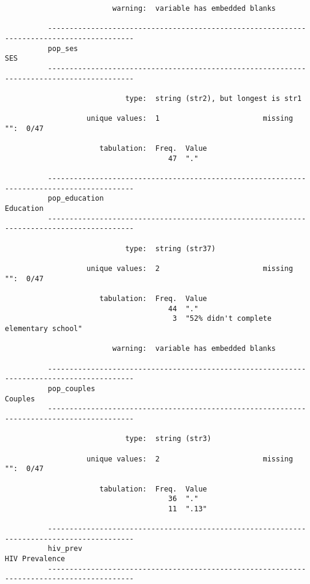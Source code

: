 \documentclass{article}
\begin{document}
\begin{verbatim}
                         warning:  variable has embedded blanks
          
          ------------------------------------------------------------------------------------------
          pop_ses                                                                                SES
          ------------------------------------------------------------------------------------------
          
                            type:  string (str2), but longest is str1
          
                   unique values:  1                        missing "":  0/47
          
                      tabulation:  Freq.  Value
                                      47  "."
          
          ------------------------------------------------------------------------------------------
          pop_education                                                                    Education
          ------------------------------------------------------------------------------------------
          
                            type:  string (str37)
          
                   unique values:  2                        missing "":  0/47
          
                      tabulation:  Freq.  Value
                                      44  "."
                                       3  "52% didn't complete elementary school"
          
                         warning:  variable has embedded blanks
          
          ------------------------------------------------------------------------------------------
          pop_couples                                                                        Couples
          ------------------------------------------------------------------------------------------
          
                            type:  string (str3)
          
                   unique values:  2                        missing "":  0/47
          
                      tabulation:  Freq.  Value
                                      36  "."
                                      11  ".13"
          
          ------------------------------------------------------------------------------------------
          hiv_prev                                                                    HIV Prevalence
          ------------------------------------------------------------------------------------------
          

\end{verbatim}
\end{document}
